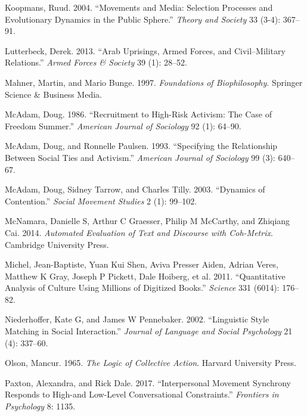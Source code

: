 \documentclass[
  english,
  man]{apa6}
\begin{document}
\leavevmode\hypertarget{ref-koopmans2004movements}{}%
Koopmans, Ruud. 2004. ``Movements and Media: Selection Processes and Evolutionary Dynamics in the Public Sphere.'' \emph{Theory and Society} 33 (3-4): 367--91.

\leavevmode\hypertarget{ref-lutterbeck2013arab}{}%
Lutterbeck, Derek. 2013. ``Arab Uprisings, Armed Forces, and Civil--Military Relations.'' \emph{Armed Forces \& Society} 39 (1): 28--52.

\leavevmode\hypertarget{ref-mahner1997foundations}{}%
Mahner, Martin, and Mario Bunge. 1997. \emph{Foundations of Biophilosophy}. Springer Science \& Business Media.

\leavevmode\hypertarget{ref-mcadam1986recruitment}{}%
McAdam, Doug. 1986. ``Recruitment to High-Risk Activism: The Case of Freedom Summer.'' \emph{American Journal of Sociology} 92 (1): 64--90.

\leavevmode\hypertarget{ref-mcadam1993specifying}{}%
McAdam, Doug, and Ronnelle Paulsen. 1993. ``Specifying the Relationship Between Social Ties and Activism.'' \emph{American Journal of Sociology} 99 (3): 640--67.

\leavevmode\hypertarget{ref-mcadam2003dynamics}{}%
McAdam, Doug, Sidney Tarrow, and Charles Tilly. 2003. ``Dynamics of Contention.'' \emph{Social Movement Studies} 2 (1): 99--102.

\leavevmode\hypertarget{ref-mcnamara2014automated}{}%
McNamara, Danielle S, Arthur C Graesser, Philip M McCarthy, and Zhiqiang Cai. 2014. \emph{Automated Evaluation of Text and Discourse with Coh-Metrix}. Cambridge University Press.

\leavevmode\hypertarget{ref-michel2011quantitative}{}%
Michel, Jean-Baptiste, Yuan Kui Shen, Aviva Presser Aiden, Adrian Veres, Matthew K Gray, Joseph P Pickett, Dale Hoiberg, et al. 2011. ``Quantitative Analysis of Culture Using Millions of Digitized Books.'' \emph{Science} 331 (6014): 176--82.

\leavevmode\hypertarget{ref-niederhoffer2002linguistic}{}%
Niederhoffer, Kate G, and James W Pennebaker. 2002. ``Linguistic Style Matching in Social Interaction.'' \emph{Journal of Language and Social Psychology} 21 (4): 337--60.

\leavevmode\hypertarget{ref-olson1965logic}{}%
Olson, Mancur. 1965. \emph{The Logic of Collective Action}. Harvard University Press.

\leavevmode\hypertarget{ref-paxton2017interpersonal}{}%
Paxton, Alexandra, and Rick Dale. 2017. ``Interpersonal Movement Synchrony Responds to High-and Low-Level Conversational Constraints.'' \emph{Frontiers in Psychology} 8: 1135.
\end{document}
